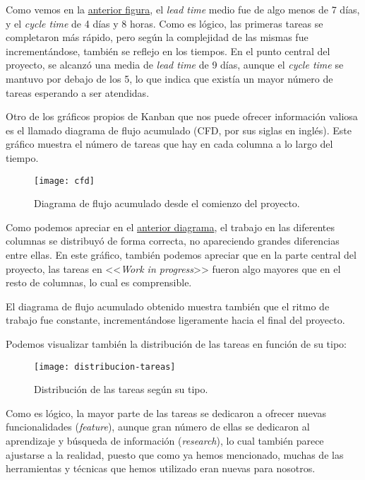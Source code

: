 Como vemos en la \hyperref[average-lead-cycle]{anterior figura}, el \emph{lead time} medio fue de algo menos de 7 días, y el \emph{cycle time} de 4 días y 8 horas. Como es lógico, las primeras tareas se completaron más rápido, pero según la complejidad de las mismas fue incrementándose, también se reflejo en los tiempos. En el punto central del proyecto, se alcanzó una media de \emph{lead time} de 9 días, aunque el \emph{cycle time} se mantuvo por debajo de los 5, lo que indica que existía un mayor número de tareas esperando a ser atendidas.

Otro de los gráficos propios de Kanban que nos puede ofrecer información valiosa es el llamado diagrama de flujo acumulado (CFD, por sus siglas en inglés). Este gráfico muestra el número de tareas que hay en cada columna a lo largo del tiempo.

\begin{figure}[h]
	\centering
	\texttt{[image: cfd]}
	\vspace{-0.7cm}
	\caption{Diagrama de flujo acumulado desde el comienzo del proyecto.}
	\label{cfd}
\end{figure}

Como podemos apreciar en el \hyperref[cfd]{anterior diagrama}, el trabajo en las diferentes columnas se distribuyó de forma correcta, no apareciendo grandes diferencias entre ellas. En este gráfico, también podemos apreciar que en la parte central del proyecto, las tareas en <<\emph{Work in progress}>> fueron algo mayores que en el resto de columnas, lo cual es comprensible.

El diagrama de flujo acumulado obtenido muestra también que el ritmo de trabajo fue constante, incrementándose ligeramente hacia el final del proyecto.

Podemos visualizar también la distribución de las tareas en función de su tipo:

\begin{figure}[h]
	\centering
	\texttt{[image: distribucion-tareas]}
	\caption{Distribución de las tareas según su tipo.}
\end{figure}

Como es lógico, la mayor parte de las tareas se dedicaron a ofrecer nuevas funcionalidades (\emph{feature}), aunque gran número de ellas se dedicaron al aprendizaje y búsqueda de información (\emph{research}), lo cual también parece ajustarse a la realidad, puesto que como ya hemos mencionado, muchas de las herramientas y técnicas que hemos utilizado eran nuevas para nosotros. 

